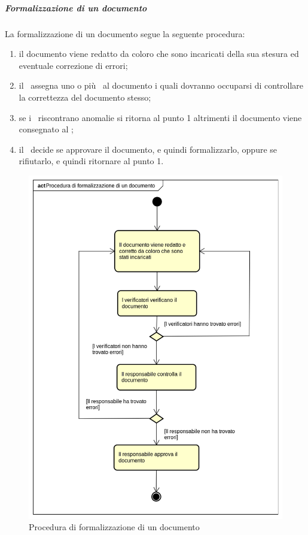 \documentclass[../NormeProgetto.text]{subfiles}
\begin{document}
				\subparagraph{Formalizzazione di un documento}
					La formalizzazione di un documento segue la seguente procedura:
					\begin{enumerate}
						\item il documento viene redatto da coloro che sono incaricati della sua stesura ed eventuale correzione di errori;
						\item il \responsabilediprogetto\ assegna uno o più \verificatori\ al documento i quali dovranno occuparsi di controllare la correttezza del documento stesso;
						\item se i \verificatori\ riscontrano anomalie si ritorna al punto 1 altrimenti il documento viene consegnato al \responsabilediprogetto;
						\item il \responsabilediprogetto\ decide se approvare il documento, e quindi formalizzarlo, oppure se rifiutarlo, e quindi ritornare al punto 1.
					\end{enumerate}
					\begin{figure}[!ht]
						\centering
						\includegraphics[scale=0.5, width=\textwidth]{sections/img/proceduraFormalizzazioneDocumento.png}
						\caption{Procedura di formalizzazione di un documento}\label{fig:Procedura di formalizzazione di un documento} 
					\end{figure}
\end{document}
